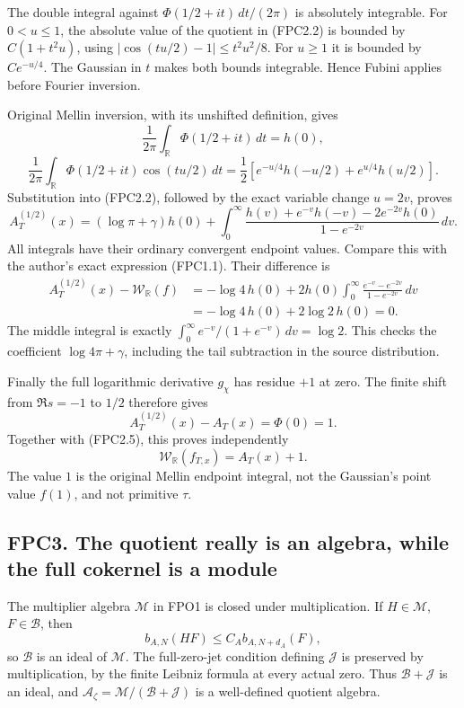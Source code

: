 The double integral against \(\Phi(1/2+it)\,dt/(2\pi)\) is absolutely
integrable. For \(0<u\le1\), the absolute value of the quotient in
(FPC2.2) is bounded by \(C(1+t^2u)\), using
\(|\cos(tu/2)-1|\le t^2u^2/8\). For \(u\ge1\) it is bounded by
\(Ce^{-u/4}\). The Gaussian in \(t\) makes both bounds integrable. Hence
Fubini applies before Fourier inversion.

Original Mellin inversion, with its unshifted definition, gives \[
\frac1{2\pi}\int_{\mathbb R}\Phi(1/2+it)\,dt=h(0),
\] \[
\frac1{2\pi}\int_{\mathbb R}
\Phi(1/2+it)\cos(tu/2)\,dt
=\frac12\left[e^{-u/4}h(-u/2)+e^{u/4}h(u/2)\right].
\tag{FPC2.3}
\] Substitution into (FPC2.2), followed by the exact variable change
\(u=2v\), proves \[
A_T^{(1/2)}(x)
=(\log\pi+\gamma)h(0)
+\int_0^\infty
\frac{h(v)+e^{-v}h(-v)-2e^{-2v}h(0)}
{1-e^{-2v}}\,dv.
\tag{FPC2.4}
\] All integrals have their ordinary convergent endpoint values. Compare
this with the author's exact expression (FPC1.1). Their difference is \[
\begin{aligned}
A_T^{(1/2)}(x)-\mathcal W_{\mathbb R}(f)
&=-\log4\,h(0)
+2h(0)\int_0^\infty
\frac{e^{-v}-e^{-2v}}{1-e^{-2v}}\,dv\\
&=-\log4\,h(0)+2\log2\,h(0)=0.
\end{aligned}
\tag{FPC2.5}
\] The middle integral is exactly
\(\int_0^\infty e^{-v}/(1+e^{-v})\,dv=\log2\). This checks the
coefficient \(\log4\pi+\gamma\), including the tail subtraction in the
source distribution.

Finally the full logarithmic derivative \(g_\chi\) has residue \(+1\) at
zero. The finite shift from \(\Re s=-1\) to \(1/2\) therefore gives \[
A_T^{(1/2)}(x)-A_T(x)=\Phi(0)=1.
\] Together with (FPC2.5), this proves independently \[
\boxed{\mathcal W_{\mathbb R}(f_{T,x})=A_T(x)+1.}
\tag{FPC2.6}
\] The value \(1\) is the original Mellin endpoint integral, not the
Gaussian's point value \(f(1)\), and not primitive \(\tau\).

\subsection{FPC3. The quotient really is an algebra, while the full
cokernel is a
module}\label{fpc3.-the-quotient-really-is-an-algebra-while-the-full-cokernel-is-a-module}

The multiplier algebra \(\mathcal M\) in FPO1 is closed under
multiplication. If \(H\in\mathcal M\), \(F\in\mathcal B\), then \[
b_{A,N}(HF)\le C_A b_{A,N+d_A}(F),
\] so \(\mathcal B\) is an ideal of \(\mathcal M\). The full-zero-jet
condition defining \(\mathcal J\) is preserved by multiplication, by the
finite Leibniz formula at every actual zero. Thus
\(\mathcal B+\mathcal J\) is an ideal, and
\(\mathcal A_\zeta=\mathcal M/(\mathcal B+\mathcal J)\) is a
well-defined quotient algebra.

